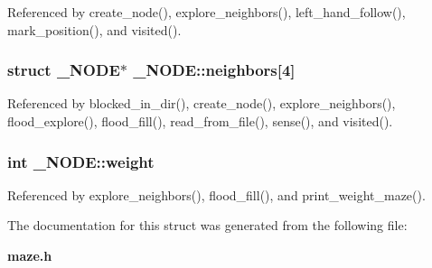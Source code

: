 Referenced by create\-\_\-node(), explore\-\_\-neighbors(), left\-\_\-hand\-\_\-follow(), mark\-\_\-position(), and visited().

\subsubsection[{neighbors}]{\setlength{\rightskip}{0pt plus 5cm}struct {\bf \-\_\-\-N\-O\-D\-E}$\ast$ \-\_\-\-N\-O\-D\-E\-::neighbors[4]}\label{struct__NODE_ab474f61f2dea616a934f16db645e83b0}


Referenced by blocked\-\_\-in\-\_\-dir(), create\-\_\-node(), explore\-\_\-neighbors(), flood\-\_\-explore(), flood\-\_\-fill(), read\-\_\-from\-\_\-file(), sense(), and visited().

\subsubsection[{weight}]{\setlength{\rightskip}{0pt plus 5cm}int \-\_\-\-N\-O\-D\-E\-::weight}\label{struct__NODE_af4551dec0caa61f0b95a8cd025a73afa}


Referenced by explore\-\_\-neighbors(), flood\-\_\-fill(), and print\-\_\-weight\-\_\-maze().



The documentation for this struct was generated from the following file\-:\begin{DoxyCompactItemize}
\item 
{\bf maze.\-h}\end{DoxyCompactItemize}
